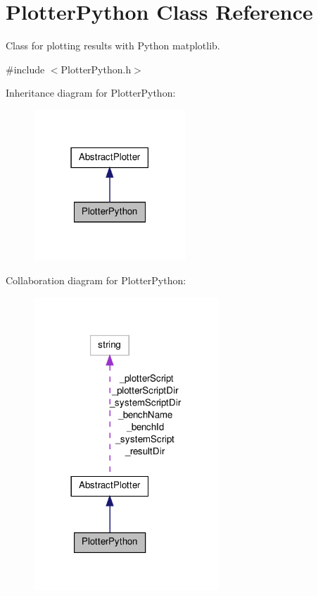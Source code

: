 \hypertarget{classPlotterPython}{\section{Plotter\-Python Class Reference}
\label{classPlotterPython}
}


Class for plotting results with Python matplotlib.  




{\ttfamily \#include $<$Plotter\-Python.\-h$>$}



Inheritance diagram for Plotter\-Python\-:\nopagebreak
\begin{figure}[H]
\begin{center}
\leavevmode
\includegraphics[width=162pt]{classPlotterPython__inherit__graph}
\end{center}
\end{figure}


Collaboration diagram for Plotter\-Python\-:\nopagebreak
\begin{figure}[H]
\begin{center}
\leavevmode
\includegraphics[width=197pt]{classPlotterPython__coll__graph}
\end{center}
\end{figure}
